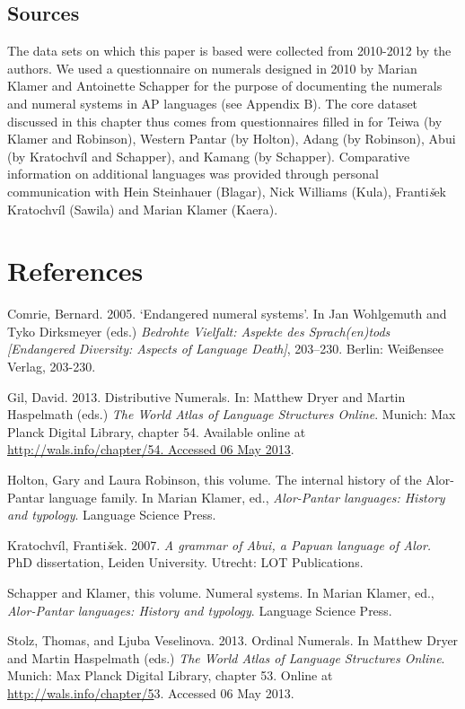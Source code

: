 \subsection[Sources]{\textup{Sources}}
\hypertarget{RefHeading105258871885726}{}The data sets on which this paper is based were collected from 2010-2012 by the authors. We used a questionnaire on numerals designed in 2010 by Marian Klamer and Antoinette Schapper for the purpose of documenting the numerals and numeral systems in AP languages (see Appendix B). The core dataset discussed in this chapter thus comes from questionnaires filled in for Teiwa (by Klamer and Robinson), Western Pantar (by Holton), Adang (by Robinson), Abui (by Kratochv\'il and Schapper), and Kamang (by Schapper). Comparative information on additional languages was provided through personal communication with Hein Steinhauer (Blagar), Nick Williams (Kula), Franti\emph{\textup{\v{s}}}ek Kratochv\'il (Sawila) and Marian Klamer (Kaera).

\section[References]{References}
\hypertarget{RefHeading105260871885726}{}Comrie, Bernard. 2005. {\textquoteleft}Endangered numeral systems{\textquoteright}. In Jan Wohlgemuth and Tyko Dirksmeyer (eds.) \textit{Bedrohte Vielfalt: Aspekte des Sprach(en)tods [Endangered Diversity: Aspects of Language Death]}, 203--230. Berlin: Wei{\ss}ensee Verlag, 203-230.

Gil, David. 2013. Distributive Numerals. In: Matthew Dryer and Martin Haspelmath (eds.) \textit{The World Atlas of Language Structures Online}. Munich: Max Planck Digital Library, chapter 54. Available online at \href{http://wals.info/chapter/54. Accessed 06 May 2013}{http://wals.info/chapter/54. Accessed 06 May 2013}.

Holton, Gary and Laura Robinson, this volume. The internal history of the Alor-Pantar language family. In Marian Klamer, ed., \textit{Alor-Pantar languages: History and typology}. Language Science Press.

Kratochv\'il, Franti\emph{\textup{\v{s}}}ek. 2007. \textit{A grammar of Abui, a Papuan language of Alor.} PhD dissertation, Leiden University. Utrecht: LOT Publications.

Schapper and Klamer, this volume. Numeral systems. In Marian Klamer, ed., \textit{Alor-Pantar languages: History and typology}. Language Science Press.

Stolz, Thomas, and Ljuba Veselinova. 2013. Ordinal Numerals. In Matthew  Dryer and Martin Haspelmath (eds.) \textit{The World Atlas of Language Structures Online}. Munich: Max Planck Digital Library, chapter 53. Online at \href{http://wals.info/feature/54}{http://wals.info/chapter/5}3. Accessed 06 May 2013.


